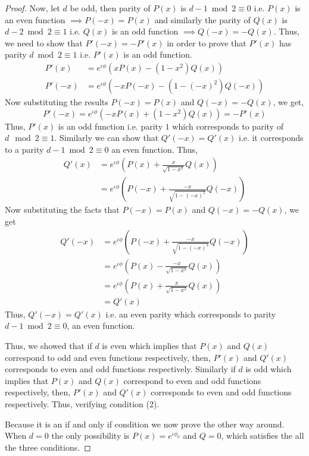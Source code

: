 \documentclass[12pt, oneside]{book}
\theoremstyle{definition}
\theoremstyle{definition}
\theoremstyle{remark}
\begin{document}
\begin{proof}
    Now, let $d$ be odd, then parity of $P(x)$ is $d-1 \bmod 2 \equiv 0$ i.e. $P(x)$ is an even function $\implies P(-x)=P(x)$ and similarly the parity of $Q(x)$ is $d-2\bmod 2 \equiv 1$ i.e. $Q(x)$ is an odd function $\implies Q(-x)=-Q(x)$. Thus, we need to show that $P'(-x)=-P'(x)$ in order to prove that $P'(x)$ has parity $d \bmod 2\equiv 1$ i.e. $P'(x)$ is an odd function.
    \begin{align*}
        P'(x) &= e^{\iota \phi}(xP(x)-(1-x^2)Q(x))\\
        P'(-x) &=e^{\iota \phi}(-xP(-x)-(1-(-x)^2)Q(-x))
    \end{align*}
    Now substituting the results $P(-x)=P(x)$ and $Q(-x)=-Q(x)$, we get,
    \[
    P'(-x) = e^{\iota \phi}(-xP(x)+(1-x^2)Q(x))=-P'(x)
    \]
    Thus, $P'(x)$ is an odd function i.e. parity $1$ which corresponds to parity of $d\mod 2\equiv 1$. Similarly we can show that $Q'(-x)=Q'(x)$ i.e. it corresponds to a parity $d-1\bmod 2\equiv 0$ an even function. Thus,
    \begin{align*}
    Q'(x)&=e^{\iota \phi}\left(P(x)+\frac{x}{\sqrt{1-x^2}}Q(x)\right)\\
    &=e^{\iota \phi} \left(P(-x)+\frac{-x}{\sqrt{1-(-x)^2}}Q(-x)\right)
    \end{align*}
    Now substituting the facts that $P(-x)=P(x)$ and $Q(-x)=-Q(x)$, we get
    \begin{align*}
        Q'(-x) &= e^{\iota \phi}\left(P(-x)+\frac{-x}{\sqrt{1-(-x)^2}}Q(-x)\right)\\
        &=e^{\iota \phi}\left(P(x)-\frac{-x}{\sqrt{1-x^2}}Q(x)\right)\\
        &=e^{\iota \phi}\left(P(x)+\frac{x}{\sqrt{1-x^2}}Q(x)\right)\\
        &=Q'(x)
    \end{align*}
    Thus, $Q'(-x)=Q'(x)$ i.e. an even parity which corresponds to parity $d-1\bmod 2\equiv 0$, an even function.
    
    Thus, we showed that if $d$ is even which implies that $P(x)$ and $Q(x)$ correspond to odd and even functions respectively, then, $P'(x)$ and $Q'(x)$ corresponds to even and odd functions respectively. Similarly if $d$ is odd which implies that $P(x)$ and $Q(x)$ correspond to even and odd functions respectively, then, $P'(x)$ and $Q'(x)$ corresponds to even and odd functions respectively. Thus, verifying condition (2).

    Because it is an if and only if condition we now prove the other way around. 
    When $d=0$ the only possibility is $P(x)=e^{\iota \phi_0}$ and $Q=0$, which satisfies the all the three conditions.
    

\end{proof}
\end{document}

